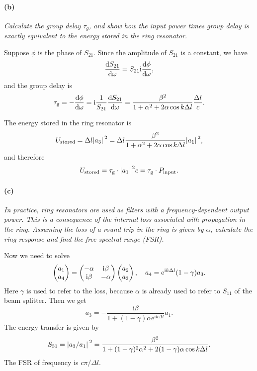\documentclass[hyperref, a4paper]{article}
\newcommand*{\ii}{\mathrm{i}}
\newcommand*{\ee}{\mathrm{e}}
\begin{document}
\paragraph*{(b)} \textit{Calculate the group delay $\tau_g$, and show how the input power times group delay is exactly equivalent to the energy stored in the ring resonator.} 

Suppose $\phi$ is the phase of $S_{21}$. 
Since the amplitude of $S_{21}$ is a constant, we have 
\[
    \dv{S_{21}}{\omega} = S_{21} \ii \dv{\phi}{\omega} ,
\]
and the group delay is 
\begin{equation}
    \tau_{\text{g}} = - \dv{\phi}{\omega} = \ii \frac{1}{S_{21}} \dv{S_{21}}{\omega}
    = \frac{\beta^2}{1 + \alpha^2 + 2 \alpha \cos k \Delta l} \frac{\Delta l}{c}.
\end{equation}

The energy stored in the ring resonator is 
\begin{equation}
    U_{\text{stored}} = \Delta l \abs*{a_3}^2 = \Delta l \frac{\beta^2}{1 + \alpha^2 + 2 \alpha \cos k \Delta l} \abs*{a_1}^2,
\end{equation}
and therefore 
\begin{equation}
    U_{\text{stored}} = \tau_{\text{g}} \cdot \abs*{a_1}^2 c = \tau_{\text{g}} \cdot P_{\text{input}}.
\end{equation}

\paragraph*{(c)} \textit{In practice, ring resonators are used as filters with a frequency-dependent output power. This is a consequence of the internal loss associated with propagation in the ring. Assuming the loss of a round trip in the ring is given by $\alpha$, calculate the ring response and find the free spectral range (FSR).} 

Now we need to solve 
\begin{equation}
    \pmqty{a_1 \\ a_4} = \pmqty{- \alpha & \ii \beta \\ \ii \beta & - \alpha} \pmqty{a_2 \\ a_3}, \quad 
    a_4 = \ee^{\ii k \Delta l} (1 - \gamma) a_3.
\end{equation}
Here $\gamma$ is used to refer to the loss, 
because $\alpha$ is already used to refer to $S_{11}$ of the beam splitter.
Then we get 
\begin{equation}
    a_3 = - \frac{\ii \beta}{1 + (1 - \gamma) \alpha \ee^{\ii k \Delta l}} a_1.
\end{equation}
The energy transfer is given by 
\begin{equation}
    S_{31} = \abs*{a_3 / a_1}^2 = \frac{\beta^2}{1 + (1 - \gamma)^2 \alpha^2 + 2 (1 - \gamma) \alpha \cos k \Delta l}.
\end{equation}
The FSR of frequency is $c \pi / \Delta l$.
\end{document}
